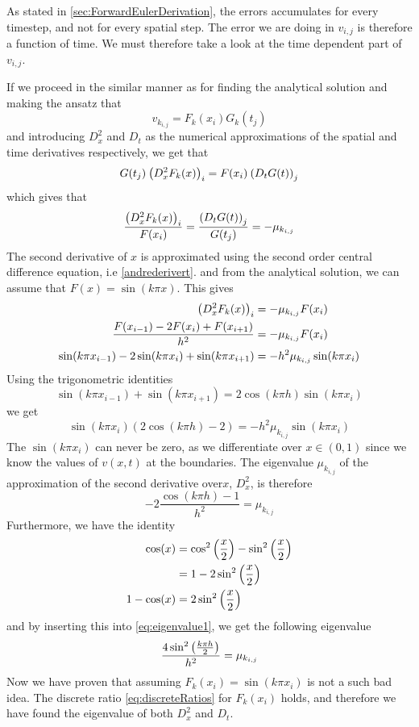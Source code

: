 \documentclass[12pt,english,a4paper]{article}
\begin{document}
As stated in \vref{sec:ForwardEulerDerivation}, the errors accumulates for every timestep, and not for every spatial step. The error we are doing in \(v_{i,j}\) is therefore a function of time. We must therefore take a look at the time dependent part of \(v_{i,j}\).

If we proceed in the similar manner as for finding the analytical solution and making the ansatz that
\[
v_{k_{i,j}} = F_k(x_i)G_k(t_j)
\]
and introducing \(D_x^2\) and \(D_t\) as the numerical approximations of the spatial and time derivatives respectively, we get that
\[
G(t_j)\:\qty(D_x^2F_k(x))_i = F(x_i)\:\qty(D_tG(t))_j
\]
which gives that
\begin{equation}\label{eq:discreteRatios}
\frac{\qty(D_x^2F_k(x))_i }{ F(x_i)} = \frac{\qty(D_tG(t))_j}{G(t_j)} = -\mu_{k_{i,j}}
\end{equation}
The second derivative of \(x\) is approximated using the second order central difference equation, i.e \vref{andrederivert}.
and from the analytical solution, we can assume that \(F(x) = \sin(k \pi x)\). This gives
\begin{align*}
\qty(D_x^2F_k(x))_i &= -\mu_{k_{i,j}}F(x_i) \\
\frac{F(x_{i-1}) -2F(x_i) + F(x_{i+1}) }{h^2} &= -\mu_{k_{i,j}}F(x_i) \\
\sin(k\pi x_{i-1}) -2\sin(k\pi x_i) + \sin(k \pi x_{i+1}) &= -h^2\mu_{k_{i,j}}\sin(k \pi x_i)
\end{align*}
Using the trigonometric identities
\[
\sin(k\pi x_{i-1}) + \sin(k\pi x_{i+1}) = 2\cos(k\pi h)\sin(k\pi x_i)
\]
we get
\[
\sin(k\pi x_i)(2\cos(k\pi h) - 2) = -h^2\mu_{k_{i,j}}\sin(k \pi x_i)
\]
The \(\sin(k\pi x_i) \) can never be zero, as we differentiate over \(x \in (0,1) \) since we know the values of \( v(x,t) \) at the boundaries. The eigenvalue \(\mu_{k_{i,j}}\) of the approximation of the second derivative over\(x \), \( D_x^2 \), is therefore
\begin{equation}\label{eq:eigenvalue1}
-2\frac{\cos(k\pi h) - 1}{h^2} =\mu_{k_{i,j}}
\end{equation}
Furthermore, we have the identity
\begin{align*}
\cos(x) &= \cos^2\qty(\frac{x}{2}) - \sin^2\qty(\frac{x}{2}) \\
&= 1- 2\sin^2\qty(\frac{x}{2}) \\
1-\cos(x) &= 2\sin^2\qty(\frac{x}{2})
\end{align*}
and by inserting this into \vref{eq:eigenvalue1}, we get the following eigenvalue
\[
\frac{4\sin^2\qty(\frac{k\pi h}{2})}{h^2} =\mu_{k_{i,j}}
\]
Now we have proven that assuming \(F_k(x_i) = \sin(k\pi x_i)\) is not a such bad idea. The discrete ratio \vref{eq:discreteRatios} for \(F_k(x_i)\) holds, and therefore we have found the eigenvalue of both \(D_x^2\) and \(D_t\).
\end{document}
